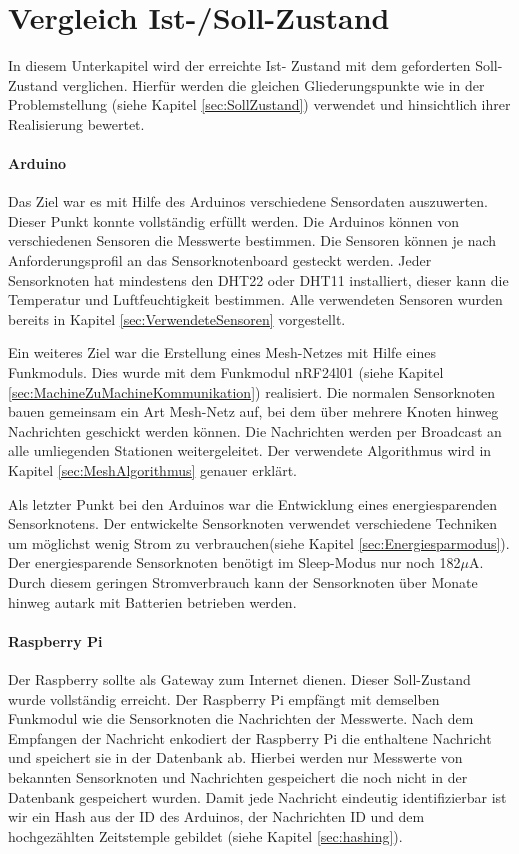 \section{Vergleich Ist-/Soll-Zustand}
\label{sec:VergleichIstSollZustand}
In diesem Unterkapitel wird der erreichte Ist- Zustand mit dem geforderten Soll-Zustand verglichen. Hierfür werden die gleichen Gliederungspunkte wie in der Problemstellung (siehe Kapitel \ref{sec:SollZustand}) verwendet und hinsichtlich ihrer Realisierung bewertet.
\paragraph{Arduino} Das Ziel war es mit Hilfe des Arduinos verschiedene Sensordaten auszuwerten. Dieser Punkt konnte vollständig erfüllt werden. Die Arduinos können von verschiedenen Sensoren die Messwerte bestimmen. Die Sensoren können je nach Anforderungsprofil an das Sensorknotenboard gesteckt werden. Jeder Sensorknoten hat mindestens den DHT22 oder DHT11 installiert, dieser kann die Temperatur und Luftfeuchtigkeit bestimmen. Alle verwendeten Sensoren wurden bereits in Kapitel \ref{sec:VerwendeteSensoren} vorgestellt.

Ein weiteres Ziel war die Erstellung eines Mesh-Netzes mit Hilfe eines Funkmoduls. Dies wurde mit dem Funkmodul nRF24l01 (siehe Kapitel \ref{sec:MachineZuMachineKommunikation}) realisiert. Die normalen Sensorknoten bauen gemeinsam ein Art Mesh-Netz auf, bei dem über mehrere Knoten hinweg Nachrichten geschickt werden können. Die Nachrichten werden per Broadcast an alle umliegenden Stationen weitergeleitet. Der verwendete Algorithmus wird in Kapitel \ref{sec:MeshAlgorithmus} genauer erklärt.

Als letzter Punkt bei den Arduinos war die Entwicklung eines energiesparenden Sensorknotens. Der entwickelte Sensorknoten verwendet verschiedene Techniken um möglichst wenig Strom zu verbrauchen(siehe Kapitel \ref{sec:Energiesparmodus}). Der energiesparende Sensorknoten benötigt im Sleep-Modus nur noch 182$\mu$A. Durch diesem geringen Stromverbrauch kann der Sensorknoten über Monate hinweg autark mit Batterien betrieben werden.
\paragraph{Raspberry Pi} Der Raspberry sollte als Gateway zum Internet dienen. Dieser Soll-Zustand wurde vollständig erreicht. Der Raspberry Pi empfängt mit demselben Funkmodul wie die Sensorknoten die Nachrichten der Messwerte. Nach dem Empfangen der Nachricht enkodiert der Raspberry Pi die enthaltene Nachricht und speichert sie in der Datenbank ab. Hierbei werden nur Messwerte von bekannten Sensorknoten und Nachrichten gespeichert die noch nicht in der Datenbank gespeichert wurden. Damit jede Nachricht eindeutig identifizierbar ist wir ein Hash aus der ID des Arduinos, der Nachrichten ID und dem hochgezählten Zeitstemple gebildet (siehe Kapitel \ref{sec:hashing}). 

